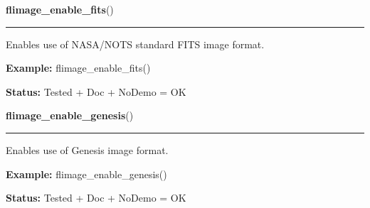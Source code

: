     \label{xformslib:flflimage:flimage_enable_fits}

    \vspace{0.5ex}

\hspace{.8\funcindent}\begin{boxedminipage}{\funcwidth}

    \raggedright \textbf{flimage\_enable\_fits}()

    \vspace{-1.5ex}

    \rule{\textwidth}{0.5\fboxrule}
\setlength{\parskip}{2ex}
    Enables use of NASA/NOTS standard FITS image format.

\setlength{\parskip}{1ex}
\textbf{Example:} flimage\_enable\_fits()



\textbf{Status:} Tested + Doc + NoDemo = OK



    \end{boxedminipage}

    \label{xformslib:flflimage:flimage_enable_genesis}

    \vspace{0.5ex}

\hspace{.8\funcindent}\begin{boxedminipage}{\funcwidth}

    \raggedright \textbf{flimage\_enable\_genesis}()

    \vspace{-1.5ex}

    \rule{\textwidth}{0.5\fboxrule}
\setlength{\parskip}{2ex}
    Enables use of Genesis image format.

\setlength{\parskip}{1ex}
\textbf{Example:} flimage\_enable\_genesis()



\textbf{Status:} Tested + Doc + NoDemo = OK



    \end{boxedminipage}

    \label{xformslib:flflimage:flimage_enable_gif}

